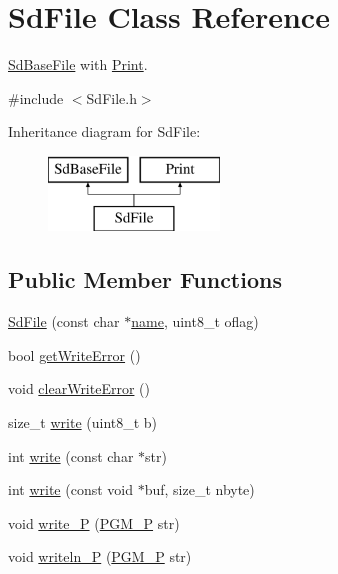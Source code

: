 \hypertarget{class_sd_file}{\section{Sd\-File Class Reference}
\label{class_sd_file}
}


\hyperlink{class_sd_base_file}{Sd\-Base\-File} with \hyperlink{class_print}{Print}.  




{\ttfamily \#include $<$Sd\-File.\-h$>$}

Inheritance diagram for Sd\-File\-:\begin{figure}[H]
\begin{center}
\leavevmode
\includegraphics[height=2.000000cm]{class_sd_file}
\end{center}
\end{figure}
\subsection*{Public Member Functions}
\begin{DoxyCompactItemize}
\item 
\hyperlink{class_sd_file_a2b40ebbf89221903430dba02f50cbd9b}{Sd\-File} (const char $\ast$\hyperlink{_sd_fat_structs_8h_a30308c9b983377042fd2cc8900454fb1}{name}, uint8\-\_\-t oflag)
\item 
bool \hyperlink{class_sd_file_a9b199fded04cffe6a609465dce43fdcc}{get\-Write\-Error} ()
\item 
void \hyperlink{class_sd_file_af50f0c1e1c726ef3dee08a84456090b9}{clear\-Write\-Error} ()
\item 
size\-\_\-t \hyperlink{class_sd_file_ac82b138293686567ab5dfbe3ba1fa1ee}{write} (uint8\-\_\-t b)
\item 
int \hyperlink{class_sd_file_abc47d1855b6d1ac124b27c3bea6ad9ef}{write} (const char $\ast$str)
\item 
int \hyperlink{class_sd_file_aaf4f4cafe922e54d7b10c1b18bf60d07}{write} (const void $\ast$buf, size\-\_\-t nbyte)
\item 
void \hyperlink{class_sd_file_af4dace00a7941e0936830200cb3fc9f9}{write\-\_\-\-P} (\hyperlink{_sd_base_file_8h_a963f816fc88a5d8479c285ed4c630229}{P\-G\-M\-\_\-\-P} str)
\item 
void \hyperlink{class_sd_file_a01a8e28448c6120f8de1db3f44c15da9}{writeln\-\_\-\-P} (\hyperlink{_sd_base_file_8h_a963f816fc88a5d8479c285ed4c630229}{P\-G\-M\-\_\-\-P} str)
\end{DoxyCompactItemize}
